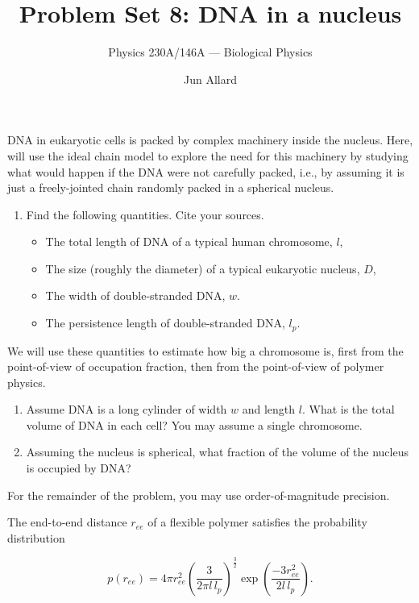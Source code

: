 \documentclass[
  letterpaper,
  DIV=11,
  numbers=noendperiod]{scrartcl}
\title{Problem Set 8: DNA in a nucleus}
\subtitle{Physics 230A/146A --- Biological Physics}
\author{Jun Allard}
\date{}
\providecommand{\tightlist}{%
  \setlength{\itemsep}{0pt}\setlength{\parskip}{0pt}}
\begin{document}
\maketitle


DNA in eukaryotic cells is packed by complex machinery inside the nucleus.
Here, will use the ideal chain model to explore the need for this machinery by studying what would happen if the DNA were not carefully packed, i.e., by assuming it is just a freely-jointed chain randomly packed in a spherical nucleus.

\begin{enumerate}
\def\labelenumi{\roman{enumi}.}
\item
  Find the following quantities. Cite your sources.

  \begin{itemize}
  \tightlist
  \item
    The total length of DNA of a typical human chromosome, \(l\),
  \item
    The size (roughly the diameter) of a typical eukaryotic nucleus, \(D\),
  \item
    The width of double-stranded DNA, \(w\).
  \item
    The persistence length of double-stranded DNA, \(l_p\).
  \end{itemize}
\end{enumerate}

We will use these quantities to estimate how big a chromosome is, first from the point-of-view of occupation fraction, then from the point-of-view of polymer physics.

\begin{enumerate}
\def\labelenumi{\roman{enumi}.}
\setcounter{enumi}{1}
\tightlist
\item
  Assume DNA is a long cylinder of width \(w\) and length \(l\).
  What is the total volume of DNA in each cell?
  You may assume a single chromosome.
\item
  Assuming the nucleus is spherical, what fraction of the volume of the nucleus is occupied by DNA?
\end{enumerate}

For the remainder of the problem, you may use order-of-magnitude precision.

The end-to-end distance \(r_{ee}\) of a flexible polymer satisfies the probability distribution

\[
p(r_{ee}) = 4\pi r_{ee}^2 \left( \frac{3}{2\pi l\,l_p}\right)^{\frac{3}{2}} \exp\left(\frac{-3r_{ee}^2}{2l\,l_p}\right).
\]
\end{document}
